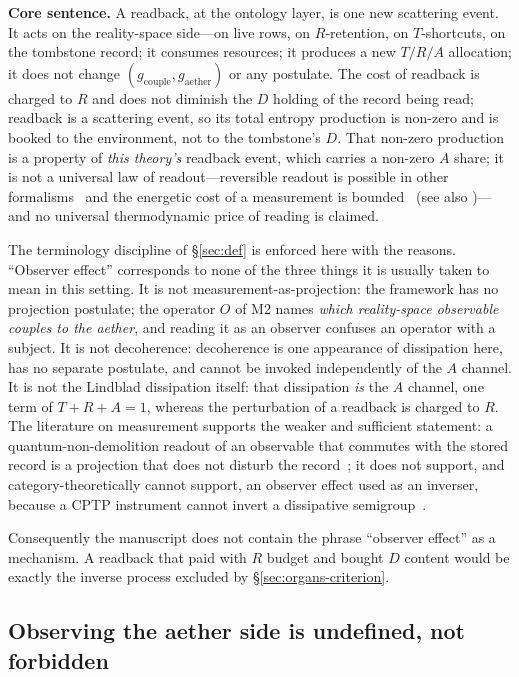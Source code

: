 \documentclass[11pt,a4paper]{article}
\newcommand{\gcouple}{g_{\mathrm{couple}}}
\newcommand{\gaether}{g_{\mathrm{aether}}}
\begin{document}
\textbf{Core sentence.} A readback, at the ontology layer, is one new scattering event. It acts on the reality-space side---on live rows, on $R$-retention, on $T$-shortcuts, on the tombstone record; it consumes resources; it produces a new $T/R/A$ allocation; it does not change $(\gcouple,\gaether)$ or any postulate. The cost of readback is charged to $R$ and does not diminish the $D$ holding of the record being read; readback is a scattering event, so its total entropy production is non-zero and is booked to the environment, not to the tombstone's $D$. That non-zero production is a property of \emph{this theory's} readback event, which carries a non-zero $A$ share; it is not a universal law of readout---reversible readout is possible in other formalisms~\cite{bennett1982} and the energetic cost of a measurement is bounded~\cite{sagawa2009} (see also \cite{sagawa2008})---and no universal thermodynamic price of reading is claimed.

The terminology discipline of \S\ref{sec:def} is enforced here with the reasons. ``Observer effect'' corresponds to none of the three things it is usually taken to mean in this setting. It is not measurement-as-projection: the framework has no projection postulate; the operator $O$ of M2 names \emph{which reality-space observable couples to the aether}, and reading it as an observer confuses an operator with a subject. It is not decoherence: decoherence is one appearance of dissipation here, has no separate postulate, and cannot be invoked independently of the $A$ channel. It is not the Lindblad dissipation itself: that dissipation \emph{is} the $A$ channel, one term of $T+R+A=1$, whereas the perturbation of a readback is charged to $R$. The literature on measurement supports the weaker and sufficient statement: a quantum-non-demolition readout of an observable that commutes with the stored record is a projection that does not disturb the record~\cite{caves1980,braginsky1992}; it does not support, and category-theoretically cannot support, an observer effect used as an inverser, because a CPTP instrument cannot invert a dissipative semigroup~\cite{davies1970,nielsenchuang2010,nayak2007}.

Consequently the manuscript does not contain the phrase ``observer effect'' as a mechanism. A readback that paid with $R$ budget and bought $D$ content would be exactly the inverse process excluded by \S\ref{sec:organs-criterion}.

\subsection{Observing the aether side is undefined, not forbidden}
\label{sec:organs-aether}
\end{document}
